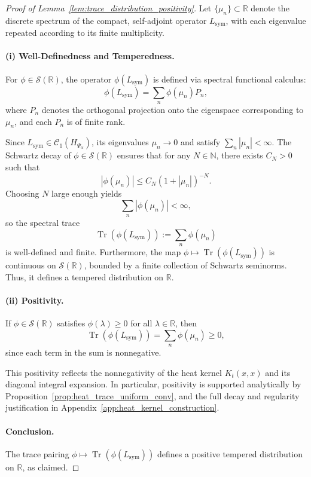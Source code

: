 \begin{proof}[Proof of Lemma~\ref{lem:trace_distribution_positivity}]
Let \( \{ \mu_n \} \subset \mathbb{R} \) denote the discrete spectrum of the compact, self-adjoint operator \( L_{\mathrm{sym}} \), with each eigenvalue repeated according to its finite multiplicity.

\paragraph{(i) Well-Definedness and Temperedness.}
For \( \phi \in \mathcal{S}(\mathbb{R}) \), the operator \( \phi(L_{\mathrm{sym}}) \) is defined via spectral functional calculus:
\[
\phi(L_{\mathrm{sym}}) = \sum_n \phi(\mu_n) P_n,
\]
where \( P_n \) denotes the orthogonal projection onto the eigenspace corresponding to \( \mu_n \), and each \( P_n \) is of finite rank.

Since \( L_{\mathrm{sym}} \in \mathcal{C}_1(H_{\Psi_\alpha}) \), its eigenvalues \( \mu_n \to 0 \) and satisfy \( \sum_n |\mu_n| < \infty \). The Schwartz decay of \( \phi \in \mathcal{S}(\mathbb{R}) \) ensures that for any \( N \in \mathbb{N} \), there exists \( C_N > 0 \) such that
\[
|\phi(\mu_n)| \le C_N (1 + |\mu_n|)^{-N}.
\]
Choosing \( N \) large enough yields
\[
\sum_n |\phi(\mu_n)| < \infty,
\]
so the spectral trace
\[
\operatorname{Tr}(\phi(L_{\mathrm{sym}})) := \sum_n \phi(\mu_n)
\]
is well-defined and finite. Furthermore, the map \( \phi \mapsto \operatorname{Tr}(\phi(L_{\mathrm{sym}})) \) is continuous on \( \mathcal{S}(\mathbb{R}) \), bounded by a finite collection of Schwartz seminorms. Thus, it defines a tempered distribution on \( \mathbb{R} \).

\paragraph{(ii) Positivity.}
If \( \phi \in \mathcal{S}(\mathbb{R}) \) satisfies \( \phi(\lambda) \ge 0 \) for all \( \lambda \in \mathbb{R} \), then
\[
\operatorname{Tr}(\phi(L_{\mathrm{sym}})) = \sum_n \phi(\mu_n) \ge 0,
\]
since each term in the sum is nonnegative.

This positivity reflects the nonnegativity of the heat kernel \( K_t(x, x) \) and its diagonal integral expansion. In particular, positivity is supported analytically by Proposition~\ref{prop:heat_trace_uniform_conv}, and the full decay and regularity justification in Appendix~\ref{app:heat_kernel_construction}.

\paragraph{Conclusion.}
The trace pairing \( \phi \mapsto \operatorname{Tr}(\phi(L_{\mathrm{sym}})) \) defines a positive tempered distribution on \( \mathbb{R} \), as claimed.
\end{proof}
